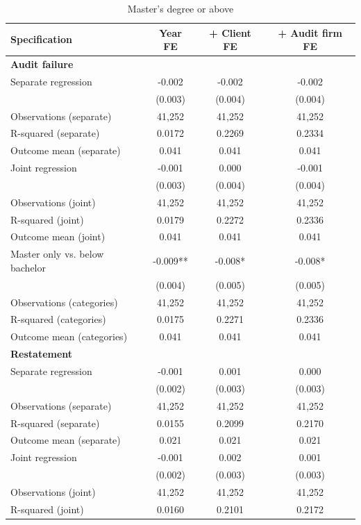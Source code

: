 \begin{table}[htbp]
\footnotesize
\centering
\caption{Master's degree or above}
\begin{threeparttable}
\begin{tabular}{p{}ccc}
\toprule
Specification & Year FE & + Client FE & + Audit firm FE \\
\midrule
\multicolumn{4}{l}{\textbf{Audit failure}} \\
Separate regression & -0.002 & -0.002 & -0.002 \\
 & (0.003) & (0.004) & (0.004) \\
Observations (separate) & 41,252 & 41,252 & 41,252 \\
R-squared (separate) & 0.0172 & 0.2269 & 0.2334 \\
Outcome mean (separate) & 0.041 & 0.041 & 0.041 \\
Joint regression & -0.001 & 0.000 & -0.001 \\
 & (0.003) & (0.004) & (0.004) \\
Observations (joint) & 41,252 & 41,252 & 41,252 \\
R-squared (joint) & 0.0179 & 0.2272 & 0.2336 \\
Outcome mean (joint) & 0.041 & 0.041 & 0.041 \\
Master only vs. below bachelor & -0.009** & -0.008* & -0.008* \\
 & (0.004) & (0.005) & (0.005) \\
Observations (categories) & 41,252 & 41,252 & 41,252 \\
R-squared (categories) & 0.0175 & 0.2271 & 0.2336 \\
Outcome mean (categories) & 0.041 & 0.041 & 0.041 \\
\multicolumn{4}{l}{\textbf{Restatement}} \\
Separate regression & -0.001 & 0.001 & 0.000 \\
 & (0.002) & (0.003) & (0.003) \\
Observations (separate) & 41,252 & 41,252 & 41,252 \\
R-squared (separate) & 0.0155 & 0.2099 & 0.2170 \\
Outcome mean (separate) & 0.021 & 0.021 & 0.021 \\
Joint regression & -0.001 & 0.002 & 0.001 \\
 & (0.002) & (0.003) & (0.003) \\
Observations (joint) & 41,252 & 41,252 & 41,252 \\
R-squared (joint) & 0.0160 & 0.2101 & 0.2172 \\

\end{tabular}
\end{threeparttable}
\end{table}
